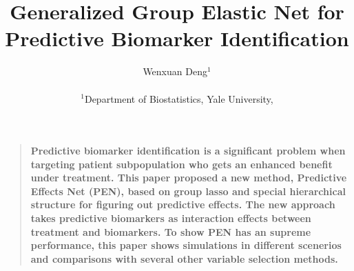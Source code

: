 \documentclass[12pt]{article}
\title{Generalized Group Elastic Net for Predictive Biomarker Identification}
\author
{Wenxuan Deng$^{1}$
\\
\\
\normalsize{$^{1}$Department of Biostatistics, Yale University,}
}
\date{}
\newenvironment{sciabstract}{%
\begin{quote} \bf}
{\end{quote}}
\begin{document}
 


\baselineskip24pt


\maketitle 




\begin{sciabstract}
  Predictive biomarker identification is a significant problem when targeting
  patient subpopulation who gets an enhanced benefit under treatment. This paper proposed
  a new method, Predictive Effects Net (PEN), based on group lasso and special hierarchical structure for figuring
  out predictive effects. The new approach takes predictive biomarkers as interaction effects between
  treatment and biomarkers. To show PEN has an supreme performance, this paper shows simulations
  in different scenerios and comparisons with several other variable selection methods.
\end{sciabstract}



\end{document}

